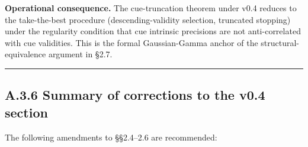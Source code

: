\documentclass{article}
\begin{document}
\textbf{Operational consequence.} The cue-truncation theorem under v0.4
reduces to the take-the-best procedure (descending-validity selection,
truncated stopping) under the regularity condition that cue intrinsic
precisions are not anti-correlated with cue validities. This is the
formal Gaussian-Gamma anchor of the structural-equivalence argument in
\S{}2.7.

\begin{center}\rule{0.5\linewidth}{0.5pt}\end{center}

\subsection{A.3.6 Summary of corrections to the v0.4
section}\label{a.3.6-summary-of-corrections-to-the-v0.4-chapter}

The following amendments to \S{}\S{}2.4--2.6 are recommended:
\end{document}
